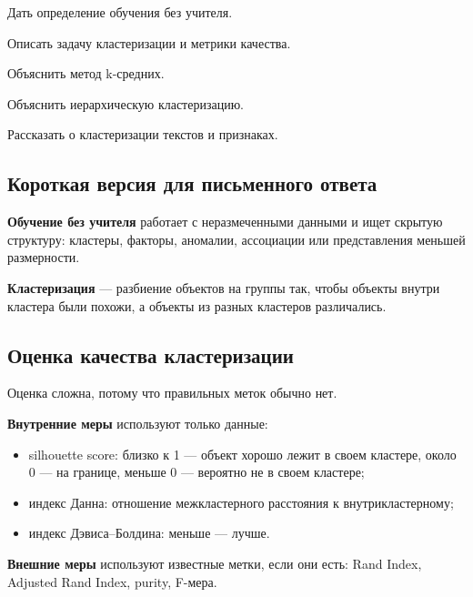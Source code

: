 
\begin{examplan}
    \item Дать определение обучения без учителя.
    \item Описать задачу кластеризации и метрики качества.
    \item Объяснить метод k-средних.
    \item Объяснить иерархическую кластеризацию.
    \item Рассказать о кластеризации текстов и признаках.
\end{examplan}

\subsection*{Короткая версия для письменного ответа}

\textbf{Обучение без учителя} работает с неразмеченными данными и ищет скрытую структуру: кластеры, факторы, аномалии, ассоциации или представления меньшей размерности.

\textbf{Кластеризация} --- разбиение объектов на группы так, чтобы объекты внутри кластера были похожи, а объекты из разных кластеров различались.

\subsection*{Оценка качества кластеризации}

Оценка сложна, потому что правильных меток обычно нет.

\textbf{Внутренние меры} используют только данные:
\begin{itemize}
    \item silhouette score: близко к 1 --- объект хорошо лежит в своем кластере, около 0 --- на границе, меньше 0 --- вероятно не в своем кластере;
    \item индекс Данна: отношение межкластерного расстояния к внутрикластерному;
    \item индекс Дэвиса--Болдина: меньше --- лучше.
\end{itemize}

\textbf{Внешние меры} используют известные метки, если они есть: Rand Index, Adjusted Rand Index, purity, F-мера.

